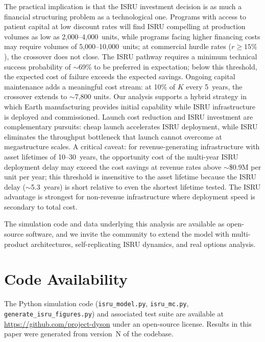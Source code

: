 \documentclass[preprint,12pt]{elsarticle}
\begin{document}
The practical implication is that the ISRU investment decision is as much a financial structuring problem as a technological one. Programs with access to patient capital at low discount rates will find ISRU compelling at production volumes as low as 2{,}000--4{,}000~units, while programs facing higher financing costs may require volumes of 5{,}000--10{,}000~units; at commercial hurdle rates ($r \geq 15\%$), the crossover does not close. The ISRU pathway requires a minimum technical success probability of $\sim$69\% to be preferred in expectation; below this threshold, the expected cost of failure exceeds the expected savings. Ongoing capital maintenance adds a meaningful cost stream: at 10\% of $K$ every 5~years, the crossover extends to $\sim$7{,}800 units. Our analysis supports a hybrid strategy in which Earth manufacturing provides initial capability while ISRU infrastructure is deployed and commissioned. Launch cost reduction and ISRU investment are complementary pursuits: cheap launch accelerates ISRU deployment, while ISRU eliminates the throughput bottleneck that launch cannot overcome at megastructure scales. A critical caveat: for revenue-generating infrastructure with asset lifetimes of 10--30~years, the opportunity cost of the multi-year ISRU deployment delay may exceed the cost savings at revenue rates above ${\sim}$\$0.9M per unit per year; this threshold is insensitive to the asset lifetime because the ISRU delay ($\sim$5.3~years) is short relative to even the shortest lifetime tested. The ISRU advantage is strongest for non-revenue infrastructure where deployment speed is secondary to total cost.

The simulation code and data underlying this analysis are available as open-source software, and we invite the community to extend the model with multi-product architectures, self-replicating ISRU dynamics, and real options analysis.

\section*{Code Availability}

The Python simulation code (\texttt{isru\_model.py}, \texttt{isru\_mc.py}, \texttt{generate\_isru\_figures.py}) and associated test suite are available at \url{https://github.com/project-dyson} under an open-source license. Results in this paper were generated from version~N of the codebase.

\end{document}
